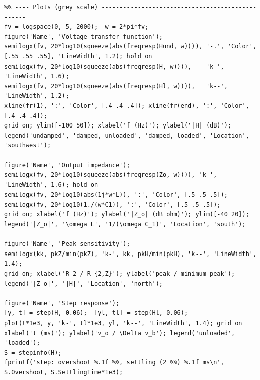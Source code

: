 \documentclass[11pt,a4paper]{article}
\begin{document}
\begin{lstlisting}
%% ---- Plots (grey scale) -------------------------------------------------
fv = logspace(0, 5, 2000);  w = 2*pi*fv;
figure('Name', 'Voltage transfer function');
semilogx(fv, 20*log10(squeeze(abs(freqresp(Hund, w)))), '-.', 'Color', [.55 .55 .55], 'LineWidth', 1.2); hold on
semilogx(fv, 20*log10(squeeze(abs(freqresp(H, w)))),    'k-',  'LineWidth', 1.6);
semilogx(fv, 20*log10(squeeze(abs(freqresp(Hl, w)))),   'k--', 'LineWidth', 1.2);
xline(fr(1), ':', 'Color', [.4 .4 .4]); xline(fr(end), ':', 'Color', [.4 .4 .4]);
grid on; ylim([-100 50]); xlabel('f (Hz)'); ylabel('|H| (dB)');
legend('undamped', 'damped, unloaded', 'damped, loaded', 'Location', 'southwest');

figure('Name', 'Output impedance');
semilogx(fv, 20*log10(squeeze(abs(freqresp(Zo, w)))), 'k-', 'LineWidth', 1.6); hold on
semilogx(fv, 20*log10(abs(1j*w*L)), ':', 'Color', [.5 .5 .5]);
semilogx(fv, 20*log10(1./(w*C1)), ':', 'Color', [.5 .5 .5]);
grid on; xlabel('f (Hz)'); ylabel('|Z_o| (dB ohm)'); ylim([-40 20]);
legend('|Z_o|', '\omega L', '1/(\omega C_1)', 'Location', 'south');

figure('Name', 'Peak sensitivity');
semilogx(kk, pkZ/min(pkZ), 'k-', kk, pkH/min(pkH), 'k--', 'LineWidth', 1.4);
grid on; xlabel('R_2 / R_{2,Z}'); ylabel('peak / minimum peak');
legend('|Z_o|', '|H|', 'Location', 'north');

figure('Name', 'Step response');
[y, t] = step(H, 0.06);  [yl, tl] = step(Hl, 0.06);
plot(t*1e3, y, 'k-', tl*1e3, yl, 'k--', 'LineWidth', 1.4); grid on
xlabel('t (ms)'); ylabel('v_o / \Delta v_b'); legend('unloaded', 'loaded');
S = stepinfo(H);
fprintf('step: overshoot %.1f %%, settling (2 %%) %.1f ms\n', S.Overshoot, S.SettlingTime*1e3);
\end{lstlisting}
\end{document}
